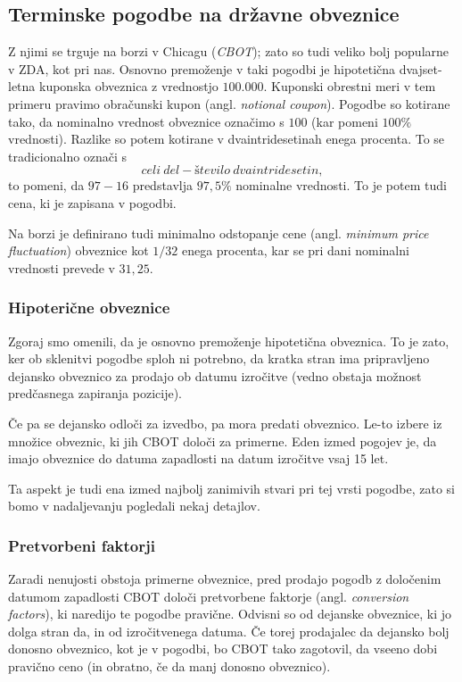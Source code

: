 \documentclass[a4paper, 12pt]{article}
\begin{document}
\subsection{Terminske pogodbe na državne obveznice}
Z njimi se trguje na borzi v Chicagu (\textit{CBOT}); zato so tudi veliko bolj popularne v ZDA, kot pri nas.
Osnovno premoženje v taki pogodbi je hipotetična dvajset-letna kuponska obveznica z vrednostjo 
\textdollar$100.000$. Kuponski obrestni meri v tem primeru pravimo obračunski kupon (angl. 
\textit{notional coupon}). Pogodbe so kotirane tako, da nominalno vrednost obveznice označimo s $100$ 
(kar pomeni $100\%$ vrednosti). Razlike so potem kotirane v dvaintridesetinah enega procenta. To se 
tradicionalno označi s 
%
$$ celi\:del - število\:dvaintridesetin, $$
%
to pomeni, da $97-16$ predstavlja $97,5\%$ nominalne vrednosti. To je potem tudi cena, ki je zapisana v 
pogodbi.

Na borzi je definirano tudi minimalno odstopanje cene (angl. \textit{minimum price fluctuation}) obveznice
kot $1/32$ enega procenta, kar se pri dani nominalni vrednosti prevede v \textdollar$31,25.$

\subsubsection{Hipoterične obveznice}
Zgoraj smo omenili, da je osnovno premoženje hipotetična obveznica. To je zato, ker ob sklenitvi pogodbe 
sploh ni potrebno, da kratka stran ima pripravljeno dejansko obveznico za prodajo ob datumu izročitve 
(vedno obstaja možnost predčasnega zapiranja pozicije). 

Če pa se dejansko odloči za izvedbo, pa mora predati obveznico. Le-to izbere iz množice obveznic, ki jih
CBOT določi za primerne. Eden izmed pogojev je, da imajo obveznice do datuma zapadlosti na datum izročitve
vsaj 15 let. 

Ta aspekt je tudi ena izmed najbolj zanimivih stvari pri tej vrsti pogodbe, zato si bomo v nadaljevanju 
pogledali nekaj detajlov.


\subsubsection{Pretvorbeni faktorji}
Zaradi nenujosti obstoja primerne obveznice, pred prodajo pogodb z določenim datumom zapadlosti CBOT 
določi pretvorbene faktorje (angl. \textit{conversion factors}), ki naredijo te pogodbe pravične. 
Odvisni so od dejanske obveznice, ki jo dolga stran da, in od izročitvenega datuma. Če torej prodajalec
da dejansko bolj donosno obveznico, kot je v pogodbi, bo CBOT tako zagotovil, da vseeno dobi pravično
ceno (in obratno, če da manj donosno obveznico).
\end{document}
